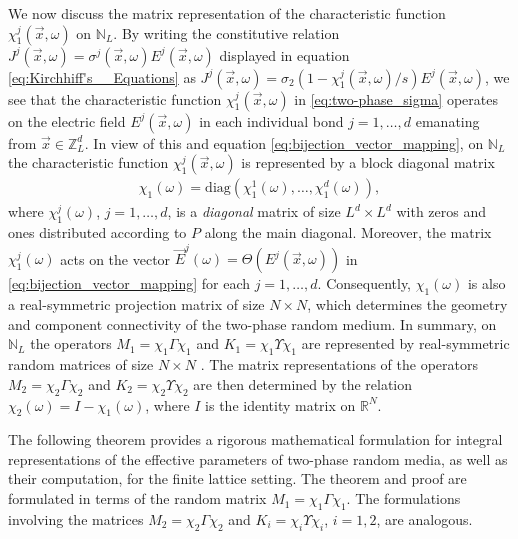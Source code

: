 \documentclass{cmslatex}
\begin{document}
We now discuss the matrix representation of the characteristic
function $\chi_1^j(\vec{x},\omega)$ on $\mathbb{N}_L$. By writing the
constitutive relation $J^j(\vec{x},\omega)=\sigma^j(\vec{x},\omega)E^j(\vec{x},\omega)$
displayed in equation \eqref{eq:Kirchhiff's__Equations} as
$J^j(\vec{x},\omega)=\sigma_2(1-\chi_1^j(\vec{x},\omega)/s)E^j(\vec{x},\omega)$, 
we see that the characteristic
function $\chi_1^j(\vec{x},\omega)$ in \eqref{eq:two-phase_sigma} operates
on the electric field
$E^j(\vec{x},\omega)$ in each individual bond $j=1,\ldots,d$ emanating from
$\vec{x}\in\mathbb{Z}_L^d$. In view of this and equation
\eqref{eq:bijection_vector_mapping}, on
$\mathbb{N}_L$ the characteristic function $\chi_1^j(\vec{x},\omega)$ is
represented by a block diagonal matrix 
%
\begin{align}\label{eq:block_diag_chi}  
  \chi_1(\omega)=\text{diag}(\chi_1^1(\omega),\ldots,\chi_1^d(\omega)),
\end{align}
%
where $\chi_1^j(\omega)$, $j=1,\ldots,d$, is a \emph{diagonal} matrix of size $L^d\times
L^d$ with zeros and ones distributed according to $P$ along the main
diagonal. Moreover, the matrix $\chi_1^j(\omega)$ acts on the vector
$\vec{E}^j(\omega)=\Theta(E^j(\vec{x},\omega))$ in
\eqref{eq:bijection_vector_mapping} for each $j=1,\ldots,d$. Consequently, 
$\chi_1(\omega)$ is also a real-symmetric projection matrix of size $N\times N$,
which determines the geometry and component connectivity of the
two-phase random medium. In summary, on $\mathbb{N}_L$ the operators
$M_1=\chi_1\Gamma\chi_1$ and $K_1=\chi_1\Upsilon\chi_1$ are represented by real-symmetric
random matrices of size $N\times N$
\cite{Golden:JBM:337,Murphy:JMP:063506}. The matrix
representations of the operators $M_2=\chi_2\Gamma\chi_2$ and $K_2=\chi_2\Upsilon\chi_2$ are
then determined by the relation $\chi_2(\omega)=I-\chi_1(\omega)$, where $I$ is the
identity matrix on $\mathbb{R}^N$.





The following theorem provides a rigorous
mathematical formulation for integral representations of the effective
parameters of two-phase random media, as well as their computation,
for the finite lattice setting. The theorem and proof are formulated
in terms of the random matrix $M_1=\chi_1\Gamma\chi_1$. The formulations involving the
matrices $M_2=\chi_2\Gamma\chi_2$ and $K_i=\chi_i\Upsilon\chi_i$, $i=1,2$, are analogous. 
\end{document}
